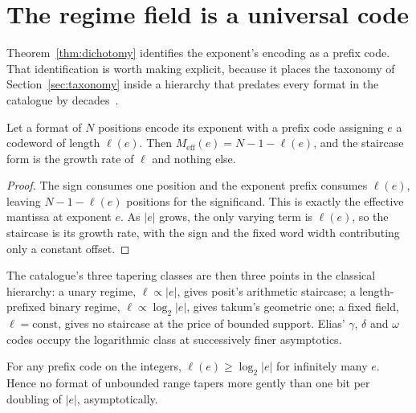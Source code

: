 \section{The regime field is a universal code}
\label{sec:codes}



Theorem~\ref{thm:dichotomy} identifies the exponent's encoding as a prefix code.
That identification is worth making explicit, because it places the taxonomy of
Section~\ref{sec:taxonomy} inside a hierarchy that predates every format in the
catalogue by decades~\cite{elias1975}.

\begin{theorem}
\label{thm:code}
Let a format of $N$ positions encode its exponent with a prefix code assigning
$e$ a codeword of length $\ell(e)$. Then
$M_{\mathrm{eff}}(e) = N - 1 - \ell(e)$, and the staircase form is the growth
rate of $\ell$ and nothing else.
\end{theorem}
\begin{proof}
The sign consumes one position and the exponent prefix consumes $\ell(e)$,
leaving $N-1-\ell(e)$ positions for the significand.  This is exactly the
effective mantissa at exponent $e$.  As $|e|$ grows, the only varying term is
$\ell(e)$, so the staircase is its growth rate, with the sign and the fixed
word width contributing only a constant offset.
\end{proof}

The catalogue's three tapering classes are then three points in the classical
hierarchy: a unary regime, $\ell \propto |e|$, gives posit's arithmetic
staircase; a length-prefixed binary regime, $\ell \propto \log_2|e|$, gives
takum's geometric one; a fixed field, $\ell = \mathrm{const}$, gives no staircase
at the price of bounded support. Elias' $\gamma$, $\delta$ and $\omega$ codes
occupy the logarithmic class at successively finer asymptotics.

\begin{theorem}
\label{thm:floor}
For any prefix code on the integers, $\ell(e) \geq \log_2|e|$ for infinitely many
$e$. Hence no format of unbounded range tapers more gently than one bit per
doubling of $|e|$, asymptotically.
\end{theorem}

